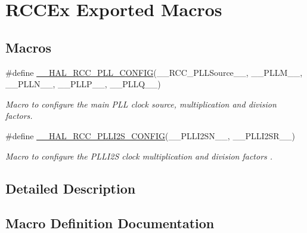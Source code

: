 \hypertarget{group___r_c_c_ex___exported___macros}{}\section{R\+C\+C\+Ex Exported Macros}
\label{group___r_c_c_ex___exported___macros}
\subsection*{Macros}
\begin{DoxyCompactItemize}
\item 
\#define \hyperlink{group___r_c_c_ex___exported___macros_ga56d9ad48b28e7aa4ad3aadca5b4fd431}{\+\_\+\+\_\+\+H\+A\+L\+\_\+\+R\+C\+C\+\_\+\+P\+L\+L\+\_\+\+C\+O\+N\+F\+IG}(\+\_\+\+\_\+\+R\+C\+C\+\_\+\+P\+L\+L\+Source\+\_\+\+\_\+,  \+\_\+\+\_\+\+P\+L\+L\+M\+\_\+\+\_\+,  \+\_\+\+\_\+\+P\+L\+L\+N\+\_\+\+\_\+,  \+\_\+\+\_\+\+P\+L\+L\+P\+\_\+\+\_\+,  \+\_\+\+\_\+\+P\+L\+L\+Q\+\_\+\+\_\+)
\begin{DoxyCompactList}\small\item\em Macro to configure the main P\+LL clock source, multiplication and division factors. \end{DoxyCompactList}\item 
\#define \hyperlink{group___r_c_c_ex___exported___macros_ga5a2fa2687b621f6eda72457d09715298}{\+\_\+\+\_\+\+H\+A\+L\+\_\+\+R\+C\+C\+\_\+\+P\+L\+L\+I2\+S\+\_\+\+C\+O\+N\+F\+IG}(\+\_\+\+\_\+\+P\+L\+L\+I2\+S\+N\+\_\+\+\_\+,  \+\_\+\+\_\+\+P\+L\+L\+I2\+S\+R\+\_\+\+\_\+)
\begin{DoxyCompactList}\small\item\em Macro to configure the P\+L\+L\+I2S clock multiplication and division factors . \end{DoxyCompactList}\end{DoxyCompactItemize}


\subsection{Detailed Description}


\subsection{Macro Definition Documentation}
\mbox{\label{group___r_c_c_ex___exported___macros_ga56d9ad48b28e7aa4ad3aadca5b4fd431}} 
